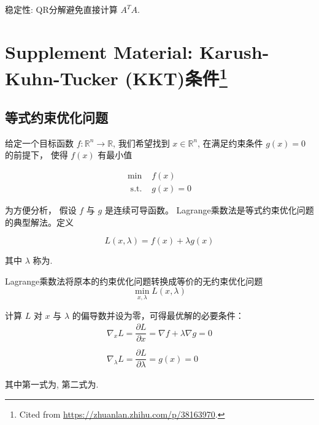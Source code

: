 稳定性: QR分解避免直接计算 $ A^{T} {A}$.

\section[Supplement Material: Karush-Kuhn-Tucker (KKT)条件]{Supplement Material: Karush-Kuhn-Tucker (KKT)条件\footnote{Cited from \url{https://zhuanlan.zhihu.com/p/38163970}.}}

\subsection{等式约束优化问题}

\begin{problem}[等式约束优化问题]
    给定一个目标函数 $ f: \mathbb{R}^{n} \rightarrow \mathbb{R} $, 我们希望找到 $ {x} \in \mathbb{R}^{n} $, 在满足约束条件 $ g({x})=0 $ 的前提下， 使得 $ f({x}) $ 有最小值

    \begin{equation}
\begin{array}{ll}
\min & f({x}) \\
\text { s.t. } & g({x})=0
\end{array}
\end{equation}
\end{problem}

为方便分析， 假设 $ f $ 与 $ g $ 是连续可导函数。 Lagrange乘数法是等式约束优化问题的典型解法。定义

\begin{definition}[Lagrangian函数]
    \begin{equation}
L({x}, \lambda)=f({x})+\lambda g({x})
\end{equation}
\end{definition}

其中 $ \lambda $ 称为. 

\begin{theorem}
    Lagrange乘数法将原本的约束优化问题转换成等价的无约束优化问题
\begin{equation}
\min _{{x}, \lambda} L({x}, \lambda)
\end{equation}
\end{theorem}

\begin{theorem}[拉格朗日乘子法最优解必要条件]
    计算 $ L $ 对 $ {x} $ 与 $ \lambda $ 的偏导数并设为零，可得最优解的必要条件：
\begin{equation}
\begin{array}{l}
\nabla_{{x}} L=\dfrac{\partial L}{\partial {x}}=\nabla f+\lambda \nabla g={0} \\
\\
\nabla_{\lambda} L=\dfrac{\partial L}{\partial \lambda}=g({x})=0
\end{array}
\end{equation}

其中第一式为, 第二式为.
\end{theorem}


